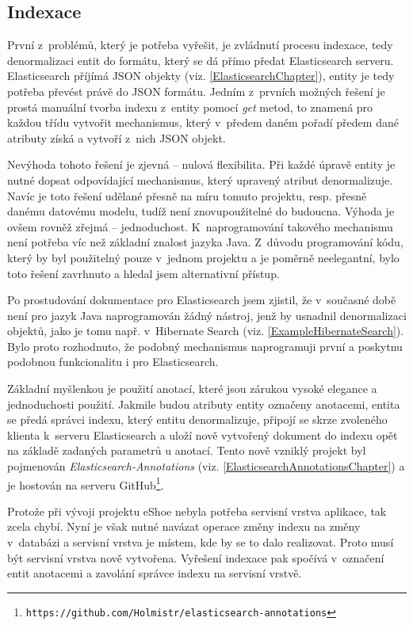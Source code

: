 \documentclass[11pt,oneside]{fithesis2}
\begin{document}
\subsection{Indexace}
\label{NavrhIndexace}
První z~problémů, který je potřeba vyřešit, je zvládnutí procesu indexace, tedy denormalizaci entit do formátu, který se dá přímo předat Elasticsearch serveru. Elasticsearch příjímá JSON objekty (viz. \ref{ElasticsearchChapter}), entity je tedy potřeba převést právě do JSON formátu. Jedním z~prvních možných řešení je prostá manuální tvorba indexu z~entity pomocí \emph{get} metod, to znamená pro každou třídu vytvořit mechanismus, který v~předem daném pořadí předem dané atributy získá a vytvoří z~nich JSON objekt.

Nevýhoda tohoto řešení je zjevná -- nulová flexibilita. Při každé úpravě entity je nutné dopsat odpovídající mechanismus, který upravený atribut denormalizuje. Navíc je toto řešení udělané přesně na míru tomuto projektu, resp. přesně danému datovému modelu, tudíž není znovupoužitelné do budoucna. Výhoda je ovšem rovněž zřejmá -- jednoduchost. K~naprogramování takového mechanismu není potřeba víc než základní znalost jazyka Java. Z~důvodu programování kódu, který by byl použitelný pouze v~jednom projektu a je poměrně neelegantní, bylo toto řešení zavrhnuto a hledal jsem alternativní přístup.

Po prostudování dokumentace pro Elasticsearch jsem zjistil, že v~současné době není pro jazyk Java naprogramován žádný nástroj, jenž by usnadnil denormalizaci objektů, jako je tomu např. v~Hibernate Search (viz. \ref{ExampleHibernateSearch}). Bylo proto rozhodnuto, že podobný mechanismus naprogramuji první a poskytnu podobnou funkcionalitu i pro Elasticsearch.

Základní myšlenkou je použití anotací, které jsou zárukou vysoké elegance a jednoduchosti použití. Jakmile budou atributy entity označeny anotacemi, entita se předá správci indexu, který entitu denormalizuje, připojí se skrze zvoleného klienta k~serveru Elasticsearch a uloží nově vytvořený dokument do indexu opět na základě zadaných parametrů u anotací. Tento nově vzniklý projekt byl pojmenován \emph{Elasticsearch-Annotations} (viz. \ref{ElasticsearchAnnotationsChapter}) a je hostován na serveru GitHub\footnote{\texttt{https://github.com/Holmistr/elasticsearch-annotations}}.

Protože při vývoji projektu eShoe nebyla potřeba servisní vrstva aplikace, tak zcela chybí. Nyní je však nutné navázat operace změny indexu na změny v~databázi a servisní vrstva je místem, kde by se to dalo realizovat. Proto musí být servisní vrstva nově vytvořena. Vyřešení indexace pak spočívá v~označení entit anotacemi a zavolání správce indexu na servisní vrstvě. 
\end{document}
